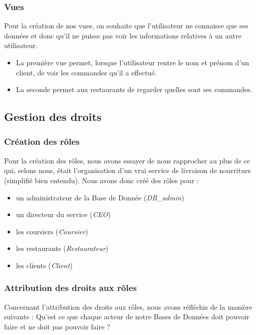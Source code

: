 \documentclass[french]{article}
\begin{document}
            \subsubsection*{Vues}
            Pour la création de nos vues, on souhaite que l'utilisateur ne connaisse que ses données et donc qu'il ne puisse pas voir les informations relatives à un autre utilisateur.
            \begin{itemize}
                \item La première vue permet, lorsque l'utilisateur rentre le nom et prénom d'un client, de voir les commandes qu'il a effectué.
                \item La seconde permet aux restaurants de regarder quelles sont ses commandes.
            \end{itemize}

        \subsection*{Gestion des droits}
            \subsubsection*{Création des rôles}
                Pour la création des rôles, nous avons essayer de nous rapprocher au plus de ce qui, selons nous, était l'organisation d'un vrai service de livraison de nourriture (simplifié bien entendu).
                Nous avons donc créé des rôles pour : 
                \begin{itemize}
                    \item un administrateur de la Base de Donnée (\textit{DB\_admin})
                    \item un directeur du service (\textit{CEO})
                    \item les coursiers (\textit{Coursier})
                    \item les restaurants (\textit{Restaurateur})
                    \item les clients (\textit{Client})
                \end{itemize}
            
            \subsubsection*{Attribution des droits aux rôles}
                Concernant l'attribution des droits aux rôles, nous avons réfléchis de la manière suivante : Qu'est ce que chaque acteur de notre Bases de Données doit pouvoir faire et ne doit pas pouvoir faire ?
\end{document}
